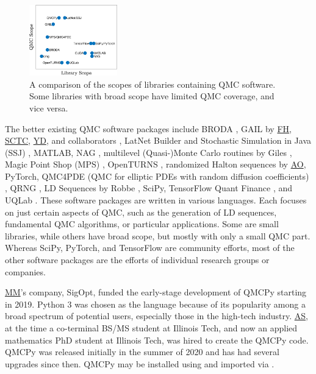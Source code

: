 \documentclass[11pt]{NSFamsart}
\newcommand{\FH}{\hyperlink{FHlink}{FH}\xspace}
\newcommand{\SCTC}{\hyperlink{SCTClink}{SCTC}\xspace}
\newcommand{\AO}{\hyperlink{AOlink}{AO}\xspace}
\newcommand{\MM}{\hyperlink{MMlink}{MM}\xspace}
\newcommand{\YD}{\hyperlink{YDlink}{YD}\xspace}
\newcommand{\AS}{\hyperlink{ASlink}{AS}\xspace}
\newcommand{\SciPy}{SciPy\xspace}
\newcommand{\TensorFlow}{TensorFlow\xspace}
\newcommand{\MATLAB}{MATLAB\xspace}
\newcommand{\PyTorch}{PyTorch\xspace}
\begin{document}
\begin{figure}
	\includegraphics[width = 0.34\textwidth]{ProgramsImages/QMCSoftwarePlot.eps}
	\caption{A comparison of the scopes of libraries containing QMC software.  Some libraries with broad scope have limited QMC coverage, and vice versa.}
	\vspace{-0.3cm}
\end{figure}

\sloppypar The better existing QMC software packages include
BRODA \cite{BRODA20a}, GAIL by \FH, \SCTC, \YD, and collaborators \cite{ChoEtal21a}, LatNet Builder \cite{LatNet} and Stochastic Simulation in Java (SSJ) \cite{SSJ}, \MATLAB \cite{MAT9.10}, NAG \cite{NAG27}, multilevel (Quasi-)Monte Carlo routines  by Giles \cite{GilesSoft}, Magic Point Shop (MPS) \cite{Nuy17a}, OpenTURNS \cite{OpenTURNS}, randomized Halton sequences by \AO \cite{Owe20a}, \PyTorch \cite{paszke2019pytorch}, QMC4PDE (QMC for elliptic PDEs with random diffusion coefficients) \cite{KuoNuy16a}, QRNG \cite{QRNG2020}, LD Sequences by Robbe \cite{Rob20a}, \SciPy \cite{virtanen2020scipy},  \TensorFlow Quant Finance \cite{tfqf2021a}, and
UQLab \cite{UQLab2014}.  These software packages are written in various languages.  
Each focuses on just certain aspects of QMC, such as the generation of LD sequences, fundamental QMC algorithms, or particular applications.  Some are small libraries, while others have broad scope, but mostly with only a small QMC part.  Whereas \SciPy, \PyTorch, and \TensorFlow are community efforts, most of the other software packages are the efforts of individual research groups or companies.

\MM's company, SigOpt, funded the early-stage development of  QMCPy starting in 2019. Python 3 was chosen as the language because of its popularity among a broad spectrum of potential users, especially those in the high-tech industry.  \AS,  at the time a co-terminal BS/MS student at Illinois Tech, and now an applied mathematics PhD student at Illinois Tech, was hired to create the QMCPy code.  QMCPy was released initially in the summer of 2020 and has had several upgrades since then.  QMCPy may be installed using  and imported via .
\end{document}
